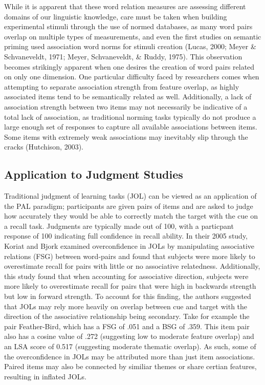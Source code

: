 \documentclass[english,man]{apa6}
\newcounter{author}
\theoremstyle{definition}
\theoremstyle{definition}
\theoremstyle{remark}
\begin{document}
While it is apparent that these word relation measures are assessing
different domains of our linguistic knowledge, care must be taken when
building experimental stimuli through the use of normed databases, as
many word pairs overlap on multiple types of measurements, and even the
first studies on semantic priming used association word norms for
stimuli creation (Lucas, 2000; Meyer \& Schvaneveldt, 1971; Meyer,
Schvaneveldt, \& Ruddy, 1975). This observation becomes strikingly
apparent when one desires the creation of word pairs related on only one
dimension. One particular difficulty faced by researchers comes when
attempting to separate association strength from feature overlap, as
highly associated items tend to be semantically related as well.
Additionally, a lack of association strength between two items may not
necessarily be indicative of a total lack of association, as traditional
norming tasks typically do not produce a large enough set of responses
to capture all available associations between items. Some items with
extremely weak associations may inevitably slip through the cracks
(Hutchison, 2003).

\subsection{Application to Judgment
Studies}\label{application-to-judgment-studies}

Traditional judgment of learning tasks (JOL) can be viewed as an
application of the PAL paradigm; participants are given pairs of items
and are asked to judge how accurately they would be able to correctly
match the target with the cue on a recall task. Judgments are typically
made out of 100, with a particpant response of 100 indicating full
confidence in recall ability. In their 2005 study, Koriat and Bjork
examined overconfidence in JOLs by manipulating associative relations
(FSG) between word-pairs and found that subjects were more likely to
overestimate recall for pairs with little or no associative relatedness.
Additionally, this study found that when accounting for associative
direction, subjects were more likely to overestimate recall for pairs
that were high in backwards strength but low in forward strength. To
account for this finding, the authors suggested that JOLs may rely more
heavily on overlap between cue and target with the direction of the
associative relationship being secondary. Take for example the pair
Feather-Bird, which has a FSG of .051 and a BSG of .359. This item pair
also has a cosine value of .272 (suggesting low to moderate feature
overlap) and an LSA score of 0.517 (suggesting moderate thematic
overlap). As such, some of the overconfidence in JOLs may be attributed
more than just item associations. Paired items may also be connected by
similiar themes or share certian features, resulting in inflated JOLs.
\end{document}
